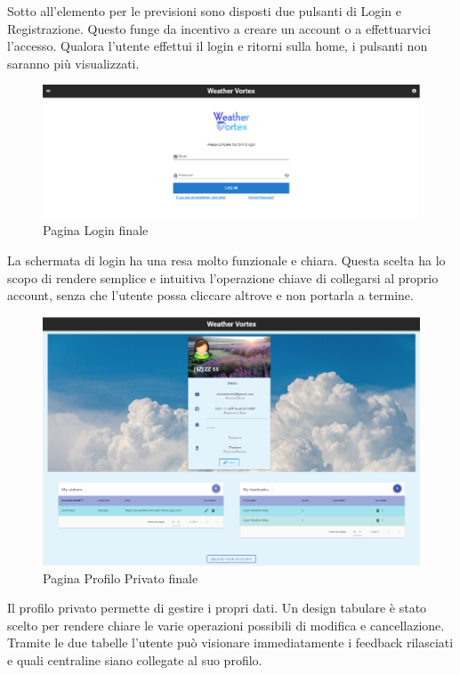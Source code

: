 Sotto all'elemento per le previsioni sono disposti due pulsanti di Login e Registrazione. Questo funge da incentivo a creare un account o a effettuarvici l'accesso. Qualora l'utente effettui il login e ritorni sulla home, i pulsanti non saranno più visualizzati.

\begin{figure}[H]
    \caption{Pagina Login finale}
    \label{fig:imLogin}
    \centering
    \includegraphics[width=1\textwidth]{Images/Login1.PNG}
\end{figure}
La schermata di login ha una resa molto funzionale e chiara. Questa scelta ha lo scopo di rendere semplice e intuitiva l'operazione chiave di collegarsi al proprio account, senza che l'utente possa cliccare altrove e non portarla a termine.
 
\begin{figure}[H]
    \caption{Pagina Profilo Privato finale}
    \label{fig:PrivProf}
    \centering
    \includegraphics[width=1\textwidth]{Images/PrivateProfile.PNG}
\end{figure}
Il profilo privato permette di gestire i propri dati. Un design tabulare è stato scelto per rendere chiare le varie operazioni possibili di modifica e cancellazione. Tramite le due tabelle l'utente può visionare immediatamente i feedback rilasciati e quali centraline siano collegate al suo profilo. 

